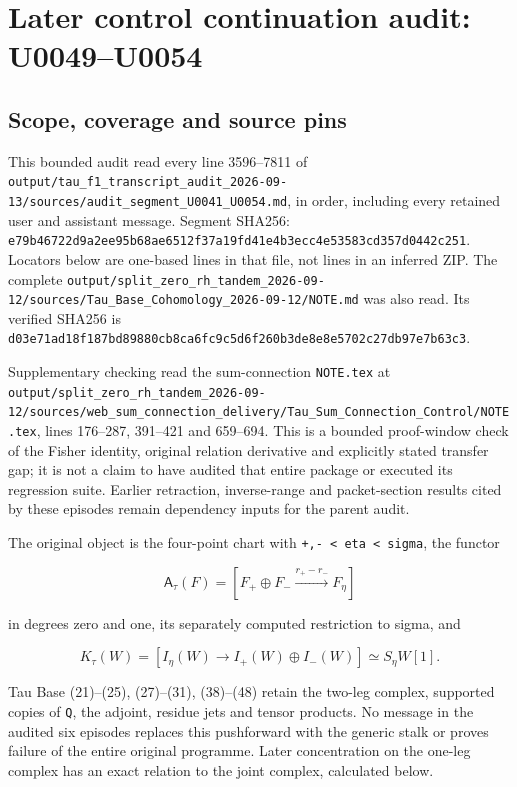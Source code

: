 \section{Later control continuation audit:
U0049--U0054}\label{later-control-continuation-audit-u0049u0054}

\subsection{Scope, coverage and source
pins}\label{scope-coverage-and-source-pins}

This bounded audit read every line 3596--7811 of
\texttt{output/tau\_f1\_transcript\_audit\_2026-09-13/sources/audit\_segment\_U0041\_U0054.md},
in order, including every retained user and assistant message. Segment
SHA256:
\texttt{e79b46722d9a2ee95b68ae6512f37a19fd41e4b3ecc4e53583cd357d0442c251}.
Locators below are one-based lines in that file, not lines in an
inferred ZIP. The complete
\texttt{output/split\_zero\_rh\_tandem\_2026-09-12/sources/Tau\_Base\_Cohomology\_2026-09-12/NOTE.md}
was also read. Its verified SHA256 is
\texttt{d03e71ad18f187bd89880cb8ca6fc9c5d6f260b3de8e8e5702c27db97e7b63c3}.

Supplementary checking read the sum-connection \texttt{NOTE.tex} at
\texttt{output/split\_zero\_rh\_tandem\_2026-09-12/sources/web\_sum\_connection\_delivery/Tau\_Sum\_Connection\_Control/NOTE.tex},
lines 176--287, 391--421 and 659--694. This is a bounded proof-window
check of the Fisher identity, original relation derivative and
explicitly stated transfer gap; it is not a claim to have audited that
entire package or executed its regression suite. Earlier retraction,
inverse-range and packet-section results cited by these episodes remain
dependency inputs for the parent audit.

The original object is the four-point chart with
\texttt{+,-\ \textless{}\ eta\ \textless{}\ sigma}, the functor

\[
\mathsf A_\tau(F)=[F_+\oplus F_-\xrightarrow{r_+-r_-}F_\eta]
\]

in degrees zero and one, its separately computed restriction to sigma,
and

\[
K_\tau(W)=[I_\eta(W)\longrightarrow I_+(W)\oplus I_-(W)]\simeq S_\eta W[1].
\]

Tau Base (21)--(25), (27)--(31), (38)--(48) retain the two-leg complex,
supported copies of \texttt{Q}, the adjoint, residue jets and tensor
products. No message in the audited six episodes replaces this
pushforward with the generic stalk or proves failure of the entire
original programme. Later concentration on the one-leg complex has an
exact relation to the joint complex, calculated below.

